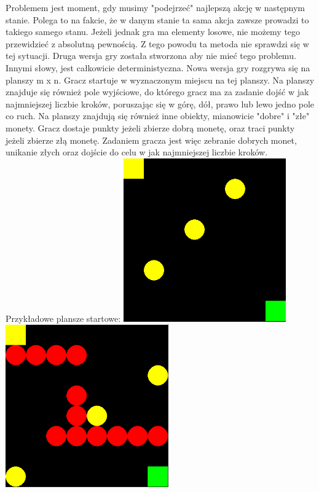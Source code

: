 \documentclass[a4paper,12pt]{article}
\begin{document}
Problemem jest moment, gdy musimy "podejrzeć" najlepszą akcję w następnym stanie. Polega to na fakcie, że w danym stanie ta sama akcja zawsze prowadzi to takiego samego stanu. Jeżeli jednak gra ma elementy losowe, nie możemy tego przewidzieć z absolutną pewnością. Z tego powodu ta metoda nie sprawdzi się w tej sytuacji. Druga wersja gry została stworzona aby nie mieć tego problemu. Innymi słowy, jest całkowicie deterministyczna.
\newline \newline
Nowa wersja gry rozgrywa się na planszy m x n. Gracz startuje w wyznaczonym miejscu na tej planszy. Na planszy znajduje się również pole wyjściowe, do którego gracz ma za zadanie dojść w jak najmniejszej liczbie kroków, poruszając się w górę, dół, prawo lub lewo jedno pole co ruch. Na planszy znajdują się również inne obiekty, mianowicie "dobre" i "złe" monety. Gracz dostaje punkty jeżeli zbierze dobrą monetę, oraz traci punkty jeżeli zbierze złą monetę. Zadaniem gracza jest więc zebranie dobrych monet, unikanie złych oraz dojście do celu w jak najmniejszej liczbie kroków.
\newline Przykładowe plansze startowe: \newline
\includegraphics[width=70mm]{przyklad1.png}
\includegraphics[width=70mm]{przyklad2.png} \newline
\end{document}
